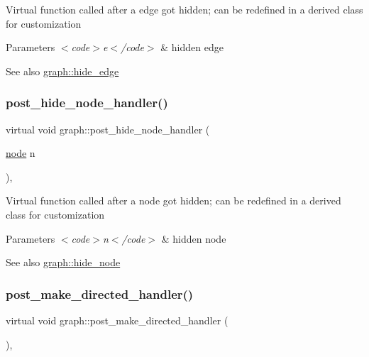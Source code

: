 Virtual function called after a edge got hidden; can be redefined in a derived class for customization


\begin{DoxyParams}{Parameters}
{\em $<$code$>$e$<$/code$>$} & hidden edge \\
\hline
\end{DoxyParams}
\begin{DoxySeeAlso}{See also}
\mbox{\hyperlink{classgraph_ab2f8520bcac080d73c55228fecc61825}{graph\+::hide\+\_\+edge}} 
\end{DoxySeeAlso}
\mbox{\label{classgraph_a89cd4d0acb9a82a85ba7845a92a68044}} 
\subsubsection{\texorpdfstring{post\+\_\+hide\+\_\+node\+\_\+handler()}{post\_hide\_node\_handler()}}
{\footnotesize\ttfamily virtual void graph\+::post\+\_\+hide\+\_\+node\+\_\+handler (\begin{DoxyParamCaption}\item[{\mbox{\hyperlink{classnode}{node}}}]{n }\end{DoxyParamCaption})\hspace{0.3cm}{\ttfamily [inline]}, {\ttfamily [virtual]}}

Virtual function called after a node got hidden; can be redefined in a derived class for customization


\begin{DoxyParams}{Parameters}
{\em $<$code$>$n$<$/code$>$} & hidden node \\
\hline
\end{DoxyParams}
\begin{DoxySeeAlso}{See also}
\mbox{\hyperlink{classgraph_a4f0177ffe8eaddd9c5bec73078bed873}{graph\+::hide\+\_\+node}} 
\end{DoxySeeAlso}
\mbox{\label{classgraph_a43dc35def3d8125eb8f3841d55e0b1c8}} 
\subsubsection{\texorpdfstring{post\+\_\+make\+\_\+directed\+\_\+handler()}{post\_make\_directed\_handler()}}
{\footnotesize\ttfamily virtual void graph\+::post\+\_\+make\+\_\+directed\+\_\+handler (\begin{DoxyParamCaption}{ }\end{DoxyParamCaption})\hspace{0.3cm}{\ttfamily [inline]}, {\ttfamily [virtual]}}

